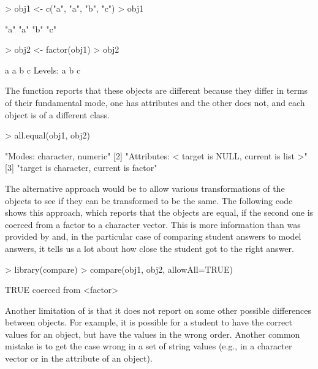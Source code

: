 \begin{Schunk}
\begin{Sinput}
> obj1 <- c("a", "a", "b", "c")
> obj1
\end{Sinput}
\begin{Soutput}
[1] "a" "a" "b" "c"
\end{Soutput}
\end{Schunk}
\begin{Schunk}
\begin{Sinput}
> obj2 <- factor(obj1)
> obj2
\end{Sinput}
\begin{Soutput}
[1] a a b c
Levels: a b c
\end{Soutput}
\end{Schunk}
The  function reports that these objects are different
because they differ in terms of their fundamental mode, one has
attributes and the other does not, and each object is of a different class.

\begin{Schunk}
\begin{Sinput}
> all.equal(obj1, obj2)
\end{Sinput}
\end{Schunk}
{\footnotesize
\begin{Schunk}
\begin{Soutput}
[1] "Modes: character, numeric"                      
[2] "Attributes: < target is NULL, current is list >"
[3] "target is character, current is factor"         
\end{Soutput}
\end{Schunk}
} %

The alternative approach would be to allow various transformations of
the objects to see if they can be transformed to be the same.
The following code shows this approach, which reports that the objects
are equal, if the second one is coerced from a factor to a character
vector.  This is more information than was provided by 
and, in the particular case of comparing student answers 
to model answers, it tells us a lot about how close the student
got to the right answer.

\begin{Schunk}
\begin{Sinput}
> library(compare)
> compare(obj1, obj2, allowAll=TRUE)
\end{Sinput}
\begin{Soutput}
TRUE
  coerced from <factor>
\end{Soutput}
\end{Schunk}
Another limitation of  is that it does not
report on some other possible differences between objects.
For example, it is possible for a student to have the correct values
for an \R{} object,
but have the values in the wrong order.  Another common mistake is to get the
case wrong in a set of string values (e.g., in a character vector
or in the  attribute of an object).


